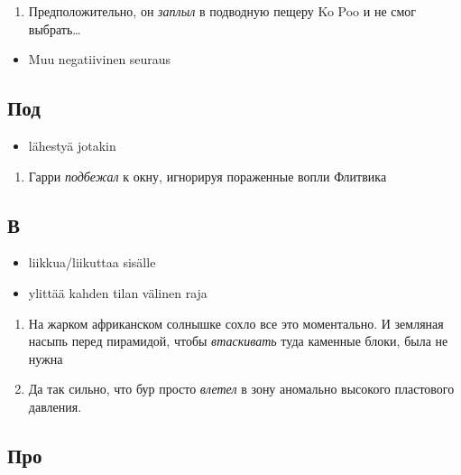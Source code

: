 \documentclass[]{scrreprt}
\providecommand{\tightlist}{%
  \setlength{\itemsep}{0pt}\setlength{\parskip}{0pt}}
\begin{document}
\begin{enumerate}
\def\labelenumi{(\arabic{enumi})}
\setcounter{enumi}{427}
\tightlist
\item
  Предположительно, он \emph{заплыл} в подводную пещеру Ko Poo и не смог
  выбрать\ldots{}
\end{enumerate}

\begin{itemize}
\tightlist
\item
  Muu negatiivinen seuraus
\end{itemize}

\subsection{Под}\label{ux43fux43eux434}

\begin{itemize}
\tightlist
\item
  lähestyä jotakin
\end{itemize}

\begin{enumerate}
\def\labelenumi{(\arabic{enumi})}
\setcounter{enumi}{428}
\tightlist
\item
  Гарри \emph{подбежал} к окну, игнорируя пораженные вопли Флитвика
\end{enumerate}

\subsection{В}\label{ux432}

\begin{itemize}
\tightlist
\item
  liikkua/liikuttaa sisälle
\item
  ylittää kahden tilan välinen raja
\end{itemize}

\begin{enumerate}
\def\labelenumi{(\arabic{enumi})}
\setcounter{enumi}{429}
\tightlist
\item
  На жарком африканском солнышке сохло все это моментально. И земляная
  насыпь перед пирамидой, чтобы \emph{втаскивать} туда каменные блоки,
  была не нужна
\item
  Да так сильно, что бур просто \emph{влетел} в зону аномально высокого
  пластового давления.
\end{enumerate}

\subsection{Про}\label{ux43fux440ux43e}
\end{document}
